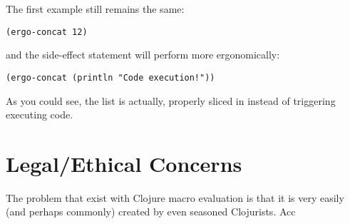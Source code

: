 \documentclass[letterpaper]{article}
\begin{document}
The first example still remains the same:

\begin{verbatim}
(ergo-concat 12)
\end{verbatim}

and the side-effect statement will perform more ergonomically: 

\begin{verbatim}
(ergo-concat (println "Code execution!"))
\end{verbatim}

As you could see, the list is actually, properly sliced in instead of triggering executing code.

\section{Legal/Ethical Concerns}
\label{sec:orgc1b20f5}
The problem that exist with Clojure macro evaluation is that it is very easily (and perhaps commonly) created by even seasoned Clojurists. Acc
\end{document}
